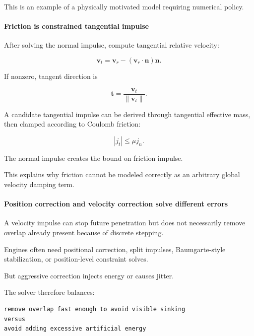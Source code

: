 This is an example of a physically motivated model requiring numerical policy.

\paragraph{Friction is constrained tangential impulse}\label{03-visual-computing-i-ch001-friction-is-constrained-tangential-impulse}

\hypertarget{03-visual-computing-i-ch001-friction-is-constrained-tangential-impulse}{}

After solving the normal impulse, compute tangential relative velocity:

\[
\mathbf v_t
=
\mathbf v_r
-
(\mathbf v_r\cdot\mathbf n)\mathbf n.
\]

If nonzero, tangent direction is

\[
\mathbf t=
\frac{\mathbf v_t}{\|\mathbf v_t\|}.
\]

A candidate tangential impulse can be derived through tangential effective mass, then clamped according to Coulomb friction:

\[
|j_t|
\le
\mu j_n.
\]

The normal impulse creates the bound on friction impulse.

This explains why friction cannot be modeled correctly as an arbitrary global velocity damping term.

\paragraph{Position correction and velocity correction solve different errors}\label{03-visual-computing-i-ch001-position-correction-and-velocity-correction-solve-different-errors}

\hypertarget{03-visual-computing-i-ch001-position-correction-and-velocity-correction-solve-different-errors}{}

A velocity impulse can stop future penetration but does not necessarily remove overlap already present because of discrete stepping.

Engines often need positional correction, split impulses, Baumgarte-style stabilization, or position-level constraint solves.

But aggressive correction injects energy or causes jitter.

The solver therefore balances:

\begin{verbatim}
remove overlap fast enough to avoid visible sinking
versus
avoid adding excessive artificial energy
\end{verbatim}

